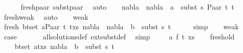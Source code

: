 \begin{isabellebody}
\ \ \ \ \isamarkupfalse%
\ fresh{\isacharunderscore}{\kern0pt}paar\ subst{\isacharunderscore}{\kern0pt}paar\ \isamarkupfalse%
\ auto\isanewline
\ \ \isamarkupfalse%
\ {\isachardoublequoteopen}{\isacharparenleft}{\kern0pt}nabla{}\ {\isasymunion}\ nabla{}{\isacharparenright}{\kern0pt}\ {\isasymturnstile}\ a\ {\isasymsharp}\ subst\ s{}\ {\isacharparenleft}{\kern0pt}Paar\ t{}\ t{}{\isacharparenright}{\kern0pt}{\isachardoublequoteclose}\isanewline
\ \ \ \ \isamarkupfalse%
\ fresh{\isacharunderscore}{\kern0pt}weak\ \isamarkupfalse%
\ auto\isanewline
\ \ \isamarkupfalse%
\ weak{}\isanewline
\ \ \isamarkupfalse%
\ fresh{\isacharcolon}{\kern0pt}\ {\isachardoublequoteopen}{\isasymforall}{\isacharparenleft}{\kern0pt}b{\isacharcomma}{\kern0pt}t{\isacharparenright}{\kern0pt}{\isasymin}set\ {\isacharparenleft}{\kern0pt}{\isacharparenleft}{\kern0pt}a{\isacharcomma}{\kern0pt}Paar\ t{}\ t{}{\isacharparenright}{\kern0pt}{\isacharhash}{\kern0pt}xs{\isacharparenright}{\kern0pt}{\isachardot}{\kern0pt}\ {\isacharparenleft}{\kern0pt}nabla{}\ {\isasymunion}\ nabla{}{\isacharparenright}{\kern0pt}\ {\isasymturnstile}\ b\ {\isasymsharp}\ subst\ s{}\ t{\isachardoublequoteclose}\isanewline
\ \ \ \ \isamarkupfalse%
\ simp\isanewline
\ \ \isamarkupfalse%
\ weak{}{\isacharparenleft}{\kern0pt}{}{\isacharparenright}{\kern0pt}\ \isamarkupfalse%
\ {\isacharquery}{\kern0pt}case\ \isanewline
\ \ \ \ \isamarkupfalse%
\ all{\isacharunderscore}{\kern0pt}solutions{\isacharunderscore}{\kern0pt}def\ ext{\isacharunderscore}{\kern0pt}subst{\isacharunderscore}{\kern0pt}def\ \isamarkupfalse%
\ simp\isanewline
{}\isamarkupfalse%
\isanewline
\ \ \isamarkupfalse%
\ {\isacharparenleft}{\kern0pt}{}\ a\ f\ t{\isacharprime}{\kern0pt}\ xs{\isacharparenright}{\kern0pt}\isanewline
\ \ \isamarkupfalse%
\ fresh{\isacharunderscore}{\kern0pt}old{\isacharcolon}{\kern0pt}\isanewline
\ \ \ \ {\isachardoublequoteopen}{\isasymforall}{\isacharparenleft}{\kern0pt}b{\isacharcomma}{\kern0pt}t{\isacharparenright}{\kern0pt}{\isasymin}set\ {\isacharparenleft}{\kern0pt}{\isacharparenleft}{\kern0pt}a{\isacharcomma}{\kern0pt}t{\isacharprime}{\kern0pt}{\isacharparenright}{\kern0pt}{\isacharhash}{\kern0pt}xs{\isacharparenright}{\kern0pt}{\isachardot}{\kern0pt}\ nabla{}\ {\isasymturnstile}\ b\ {\isasymsharp}\ subst\ s{}\ t{\isachardoublequoteclose}\isanewline

\end{isabellebody}
